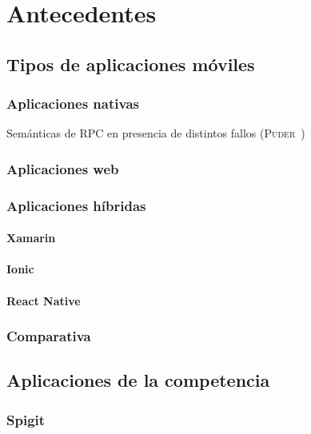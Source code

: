 \chapter{Antecedentes}
\label{chap:antecedentes}

\section{Tipos de aplicaciones móviles}

\subsection{Aplicaciones nativas}

\begin{table}[nativas]
	\centering
	{\small
		
	}
	\caption[Semánticas de \acs{RPC} en presencia de distintos fallos]
	{Semánticas de \acs{RPC} en presencia de distintos fallos
		(\textsc{Puder}~\cite{puder05:_distr_system_archit})}
	\label{tab:rpc-semantics}
\end{table}

\subsection{Aplicaciones web}

\subsection{Aplicaciones híbridas}
\subsubsection{Xamarin}
\subsubsection{Ionic}
\subsubsection{React Native}

\subsection{Comparativa}


\section{Aplicaciones de la competencia}
\subsection{Spigit}
